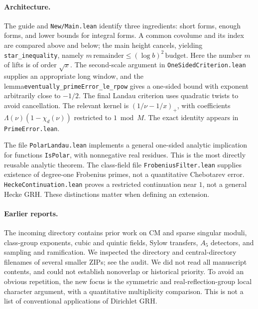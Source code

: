 \documentclass[11pt]{article}
\theoremstyle{remark}\newtheorem{remark}[theorem]{Remark}
\begin{document}
\paragraph{Architecture.} The guide and \texttt{New/Main.lean} identify three ingredients: short forms, enough forms, and lower bounds for integral forms. A common covolume and its index are compared above and below; the main height cancels, yielding \texttt{star\_inequality}, namely $m\,\mathrm{remainder}\le (\log b)^2\,\mathrm{budget}$. Here the number $m$ of lifts is of order $\sqrt{x}$. The second-scale argument in \texttt{OneSidedCriterion.lean} supplies an appropriate long window, and the lemma\newline \texttt{eventually\_primeError\_le\_rpow} gives a one-sided bound with exponent arbitrarily close to $-1/2$. The final Landau criterion uses quadratic twists to avoid cancellation. The relevant kernel is $\left(1/\nu-1/x\right)_+$, with coefficients $\Lambda(\nu)(1-\chi_d(\nu))$ restricted to $1\bmod M$. The exact identity appears in \texttt{PrimeError.lean}.

The file \texttt{PolarLandau.lean} implements a general one-sided analytic implication for functions \texttt{IsPolar}, with nonnegative real residues. This is the most directly reusable analytic theorem. The class-field file \texttt{FrobeniusFilter.lean} supplies existence of degree-one Frobenius primes, not a quantitative Chebotarev error. \texttt{HeckeContinuation.lean} proves a restricted continuation near $1$, not a general Hecke GRH. These distinctions matter when defining an extension.

\paragraph{Earlier reports.} The incoming directory \cite{incoming} contains prior work on CM and sparse singular moduli, class-group exponents, cubic and quintic fields, Sylow transfers, $A_5$ detectors, and sampling and ramification. We inspected the directory and central-directory filenames of several smaller ZIPs; see the audit. We did not read all manuscript contents, and could not establish nonoverlap or historical priority. To avoid an obvious repetition, the new focus is the symmetric and real-reflection-group local character argument, with a quantitative multiplicity comparison. This is not a list of conventional applications of Dirichlet GRH.
\end{document}

